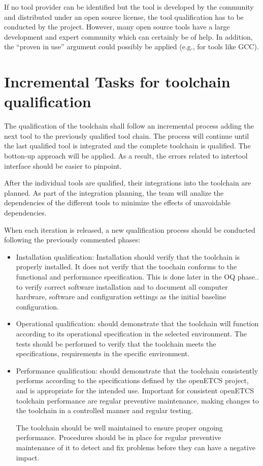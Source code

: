 If no tool provider can be identified but the tool is developed by the community and distributed under an open source license, the tool qualification has to be conducted by the project. However, many open source tools have a large development and expert community which can certainly be of help. In addition, the ``proven in use'' argument could possibly be applied (e.g., for tools like GCC).

\section{Incremental Tasks for toolchain qualification}
The qualification of the toolchain shall follow an incremental process adding the next tool to the previously qualified tool chain. The process will continue until the last qualified tool is integrated and the complete toolchain is qualified. The botton-up approach will be applied. As a result, the errors related to intertool interface should be easier to pinpoint.

After the individual tools are qualified, their integrations into the toolchain are planned. As part of the integration planning, the team will analize the dependencies of the different tools to minimize the effects of unavoidable dependencies. 

When each iteration is released, a new qualification process should be conducted following the previously commented phases:
\begin{itemize}
\item Installation qualification: Installation should verify that the toolchain is properly installed. It does not verify that the toochain conforms to the functional and performance specification. This is done later in the OQ phase..  to verify correct software installation and to document all computer hardware, software and configuration settings as the initial baseline configuration.
\item Operational qualification: should demonstrate that the toolchain will function according to its operational specification in the selected environment. The tests should be performed to verify that the toolchain meets the specifications, requirements in the specific environment.
\item Performance qualification: should demonstrate that the toolchain consistently performs according to the specifications defined by the openETCS project, and is appropriate for the intended use. Important for consistent openETCS toolchain performance are regular preventive maintenance, making changes to the toolchain in a controlled manner and regular testing.

The toolchain should be well maintained to ensure proper ongoing performance. Procedures should be in place for regular preventive maintenance of it to detect and fix problems before they can have a negative impact.
\end{itemize}

